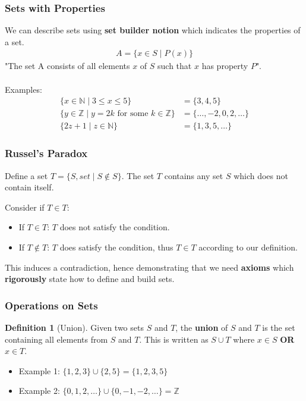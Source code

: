 \documentclass[12pt]{article}
\newcommand{\Z}{\mathbb{Z}}
\newcommand{\N}{\mathbb{N}}
\theoremstyle{definition}
\newtheorem{definition}{Definition}
\begin{document}
        \subsubsection{Sets with Properties}
        We can describe sets using \textbf{set builder notion} which indicates the properties of a set.
        \begin{align*}
            A = \{x \in S \mid P(x) \}
        \end{align*}
        "The set A consists of all elements $x$ of $S$ such that $x$ has property $P$".\\\\
        Examples:
            \begin{align*}
                \{x \in \N \mid 3 \le x \le 5\} &= \{3,4,5\} \\
                \{y \in \Z \mid y=2k \text{ for some } k \in \Z\} &= \{\dots, -2, 0, 2, \dots\} \\
                \{2z + 1 \mid z \in \N\} &= \{1, 3, 5, \dots\}
            \end{align*}
        
            \subsubsection{Russel's Paradox}
            Define a set $T = \{S, set \mid S \notin S\}$. The set $T$ contains any set $S$ which does not contain itself.
            
            Consider if $T \in T$:
            \begin{itemize}
                \item If $T \in T$: $T$ does not satisfy the condition.
                \item If $T \notin T$: $T$ does satisfy the condition, thus $T \in T$ according to our definition.
            \end{itemize}
            This induces a contradiction, hence demonstrating that we need \textbf{axioms} which \textbf{rigorously} state
            how to define and build sets.
        
            \subsubsection{Operations on Sets}
            \begin{definition}[Union]
                \label{def:union}
                Given two sets $S$ and $T$, the \textbf{union} of $S$ and $T$ is the set containing all elements from $S$ and $T$.
                This is written as $S \cup T$ where $x \in S$ \textbf{OR} $x \in T$.
            \end{definition}
            \begin{itemize}
                \item Example 1: $\{1,2,3\} \cup \{2,5\} = \{1,2,3,5\}$
                \item Example 2: $\{0,1,2,\dots\} \cup \{0,-1,-2,\dots\} = \Z$ \\
            \end{itemize}
\end{document}
